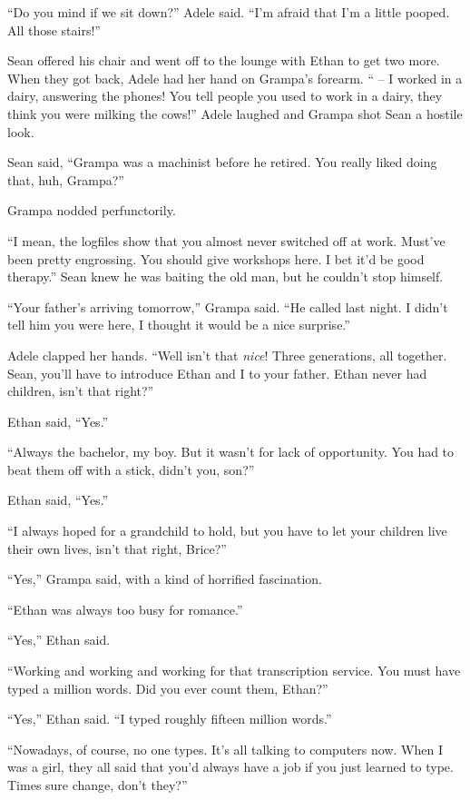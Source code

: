 “Do you mind if we sit down?” Adele said. “I'm afraid that I'm a 
little pooped. All those stairs!”

Sean offered his chair and went off to the lounge with Ethan to get two 
more. When they got back, Adele had her hand on Grampa's forearm. “ 
-- I worked in a dairy, answering the phones! You tell people you used 
to work in a dairy, they think you were milking the cows!” Adele 
laughed and Grampa shot Sean a hostile look.

Sean said, “Grampa was a machinist before he retired. You really 
liked doing that, huh, Grampa?”

Grampa nodded perfunctorily.

“I mean, the logfiles show that you almost never switched off at 
work. Must've been pretty engrossing. You should give workshops here. I 
bet it'd be good therapy.” Sean knew he was baiting the old man, but 
he couldn't stop himself.

“Your father's arriving tomorrow,” Grampa said. “He called last 
night. I didn't tell him you were here, I thought it would be a nice 
surprise.”

Adele clapped her hands. “Well isn't that \emph{nice}! Three 
generations, all together. Sean, you'll have to introduce Ethan and I 
to your father. Ethan never had children, isn't that right?”

Ethan said, “Yes.”

“Always the bachelor, my boy. But it wasn't for lack of opportunity. 
You had to beat them off with a stick, didn't you, son?”

Ethan said, “Yes.”

“I always hoped for a grandchild to hold, but you have to let your 
children live their own lives, isn't that right, Brice?”

“Yes,” Grampa said, with a kind of horrified fascination.

“Ethan was always too busy for romance.”

“Yes,” Ethan said.

“Working and working and working for that transcription service. You 
must have typed a million words. Did you ever count them, Ethan?”

“Yes,” Ethan said. “I typed roughly fifteen million words.”

“Nowadays, of course, no one types. It's all talking to computers 
now. When I was a girl, they all said that you'd always have a job if 
you just learned to type. Times sure change, don't they?”

